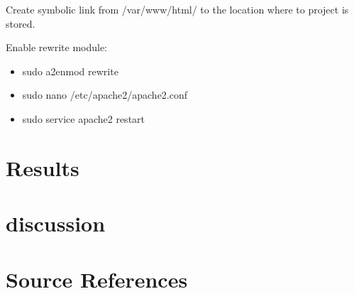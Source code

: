 \documentclass[journal]{IEEEtran}
\begin{document}
Create symbolic link from /var/www/html/ to the location where to project is stored.

Enable rewrite module:
\begin{itemize}
	\item sudo a2enmod rewrite
	\item sudo nano /etc/apache2/apache2.conf
	\item sudo service apache2 restart
\end{itemize}

\section{Results}
\label{subsec:results}

\section{discussion}
\label{subsec:discussion}

\section{Source References}
\label{subsec:source references}
\end{document}
